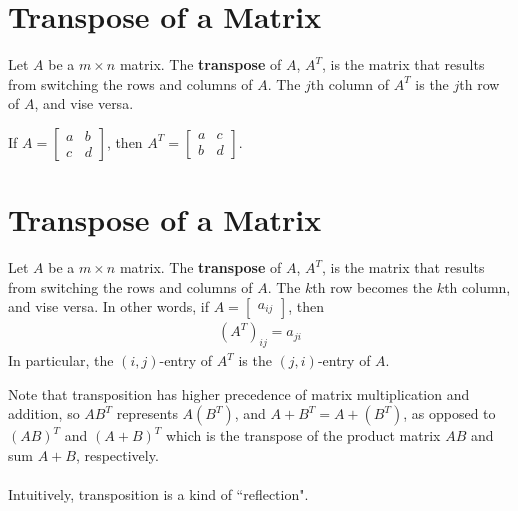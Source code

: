 \documentclass[letterpaper,12pt]{article}
\begin{document}
\section*{Transpose of a Matrix}
\begin{definition}
Let $A$ be a $m \times n$ matrix. The \textbf{transpose} of $A$, $A^T$, is the matrix that results from switching the rows and columns of $A$. The $j$th column of $A^T$ is the $j$th row of $A$, and vise versa.
\end{definition}

\begin{example}
If $A = \begin{bmatrix} a & b \\ c & d \end{bmatrix}$, then $A^T = \begin{bmatrix} a & c \\ b & d \end{bmatrix}$.
\end{example}

\section*{Transpose of a Matrix}
\begin{definition}
Let $A$ be a $m \times n$ matrix. The \textbf{transpose} of $A$, $A^T$, is the matrix that results from switching the rows and columns of $A$. The $k$th row becomes the $k$th column, and vise versa. In other words, if $A = \begin{bmatrix} a_{ij} \end{bmatrix}$, then
\begin{align*}
    (A^T)_{ij} = a_{ji}
\end{align*}
In particular, the $(i,j)$-entry of $A^T$ is the $(j,i)$-entry of $A$.
\end{definition}

Note that transposition has higher precedence of matrix multiplication and addition, so $AB^T$ represents $A(B^T)$, and $A + B^T = A + (B^T)$, as opposed to $(AB)^T$ and $(A + B)^T$ which is the transpose of the product matrix $AB$ and sum $A + B$, respectively.
\\ \\ Intuitively, transposition is a kind of ``reflection".
\end{document}
